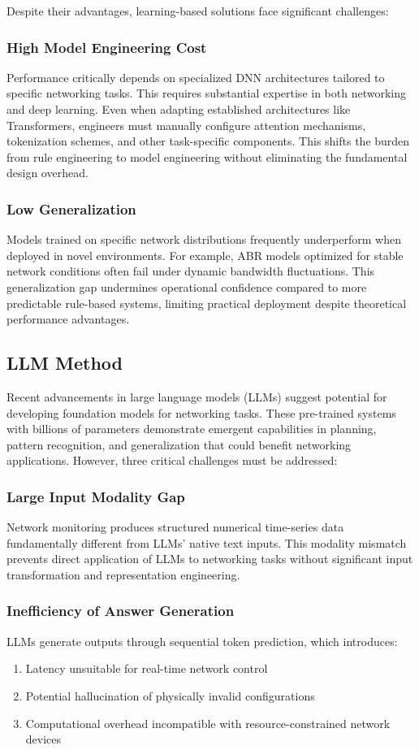 \documentclass[twocolumn]{article}
\begin{document}
Despite their advantages, learning-based solutions face significant challenges:

\subsubsection{High Model Engineering Cost}
Performance critically depends on specialized DNN architectures tailored to specific networking tasks. This requires substantial expertise in both networking and deep learning. Even when adapting established architectures like Transformers, engineers must manually configure attention mechanisms, tokenization schemes, and other task-specific components. This shifts the burden from rule engineering to model engineering without eliminating the fundamental design overhead.

\subsubsection{Low Generalization}
Models trained on specific network distributions frequently underperform when deployed in novel environments. For example, ABR models optimized for stable network conditions often fail under dynamic bandwidth fluctuations. This generalization gap undermines operational confidence compared to more predictable rule-based systems, limiting practical deployment despite theoretical performance advantages.

\subsection{LLM Method}
Recent advancements in large language models (LLMs) suggest potential for developing foundation models for networking tasks. These pre-trained systems with billions of parameters demonstrate emergent capabilities in planning, pattern recognition, and generalization that could benefit networking applications. However, three critical challenges must be addressed:

\subsubsection{Large Input Modality Gap}
Network monitoring produces structured numerical time-series data fundamentally different from LLMs' native text inputs. This modality mismatch prevents direct application of LLMs to networking tasks without significant input transformation and representation engineering.

\subsubsection{Inefficiency of Answer Generation}
LLMs generate outputs through sequential token prediction, which introduces:
\begin{enumerate}[itemsep=0pt, topsep=2pt, parsep=0pt]
  \item Latency unsuitable for real-time network control
  \item Potential hallucination of physically invalid configurations
  \item Computational overhead incompatible with resource-constrained network devices
\end{enumerate}
\end{document}
